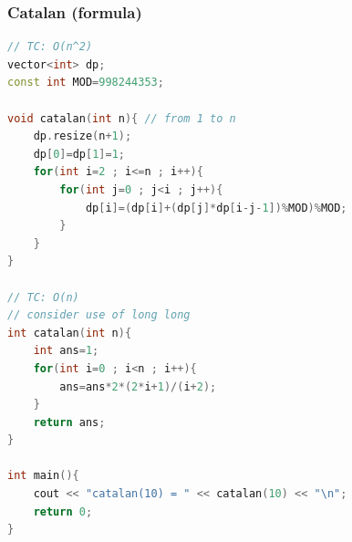 \subsubsection{Catalan (formula)}
\begin{lstlisting}[style=mystyle, language=C++]
// TC: O(n^2)
vector<int> dp;
const int MOD=998244353;

void catalan(int n){ // from 1 to n
	dp.resize(n+1);
	dp[0]=dp[1]=1;
	for(int i=2 ; i<=n ; i++){
		for(int j=0 ; j<i ; j++){
			dp[i]=(dp[i]+(dp[j]*dp[i-j-1])%MOD)%MOD;
		}
	}
}

// TC: O(n)
// consider use of long long
int catalan(int n){
	int ans=1;
	for(int i=0 ; i<n ; i++){
		ans=ans*2*(2*i+1)/(i+2);
	}
	return ans;
}

int main(){
	cout << "catalan(10) = " << catalan(10) << "\n";
	return 0;
}
\end{lstlisting}
